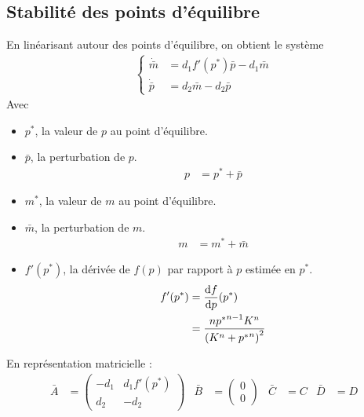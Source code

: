 \documentclass[a4paper, 12pt]{article}
\begin{document}
	\subsection{Stabilité des points d'équilibre}
	En linéarisant autour des points d'équilibre, on obtient le système
	\begin{align}
		\left\{
		\begin{aligned}
			\dot{\bar{m}} & = {d}_{1}{f'}({p}^{*})\bar{p} - {d}_{1}\bar{m} \\
			\dot{\bar{p}} & = {d}_{2}\bar{m} - {d}_{2}\bar{p}
		\end{aligned}
		\right.
	\end{align}
	Avec
	\begin{itemize}
		\item ${p}^{*}$, la valeur de $p$ au point d'équilibre.
		\item $\bar{p}$, la perturbation de $p$.
		\begin{align*}
			p & = {p}^{*} + \bar{p}
		\end{align*}
		\item ${m}^{*}$, la valeur de $m$ au point d'équilibre.
		\item $\bar{m}$, la perturbation de $m$.
		\begin{align*}
			m & = {m}^{*} + \bar{m}
		\end{align*}
		\item ${f'}({p}^{*})$, la dérivée de $f(p)$ par rapport à $p$ estimée en ${p}^{*}$.
		\begin{align*}
			{f'}({p}^{*}) & = \frac{\mathrm{d} f}{\mathrm{d} p}({p}^{*})                                     \\
			              & = \frac{n{{p}^{*}}^{n-1}{K}^{n}}{\left({K}^{n} + {{p}^{*}}^{n}\right)^2}
		\end{align*}
	\end{itemize}
	En représentation matricielle :
	\begin{align}
	\bar{A} & = 
	\begin{pmatrix}
		-{d}_{1} & {d}_{1}{f'}({p}^{*}) \\
		{d}_{2}  & -{d}_{2}
	\end{pmatrix} &
	\bar{B} & = 
	\begin{pmatrix}
		0 \\
		0
	\end{pmatrix} &
	\bar{C} & = C &
	\bar{D} & = D
	\end{align}
\end{document}

